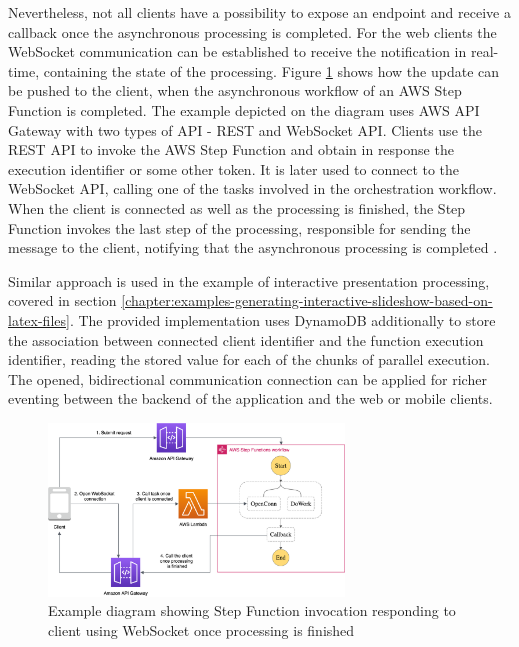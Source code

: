 Nevertheless, not all clients have a possibility to expose an endpoint and receive a callback once the asynchronous processing is completed.
For the web clients the WebSocket communication can be established to receive the notification in real-time, containing the state of the processing.
Figure \ref{fig:pattern-async-step-function} shows how the update can be pushed to the client, when the asynchronous workflow of an AWS Step Function is completed.
The example depicted on the diagram uses AWS API Gateway with two types of API - REST and WebSocket API.
Clients use the REST API to invoke the AWS Step Function and obtain in response the execution identifier or some other token.
It is later used to connect to the WebSocket API, calling one of the tasks involved in the orchestration workflow.
When the client is connected as well as the processing is finished, the Step Function invokes the last step of the processing, responsible for sending the message to the client, notifying that the asynchronous processing is completed \cite{ServerlessAtScaleDesignPatternsAndOptimizations}.

Similar approach is used in the example of interactive presentation processing, covered in section \ref{chapter:examples-generating-interactive-slideshow-based-on-latex-files}.
The provided implementation uses DynamoDB additionally to store the association between connected client identifier and the function execution identifier, reading the stored value for each of the chunks of parallel execution.
The opened, bidirectional communication connection can be applied for richer eventing between the backend of the application and the web or mobile clients.

\begin{figure}[H]
   \centering
   \includegraphics[width=0.7\textwidth]{assets/04-serverless-for-web-apps/asyncStepFunction.png}
   \caption{Example diagram showing Step Function invocation responding to client using WebSocket once processing is finished}
   \label{fig:pattern-async-step-function}
\end{figure}

